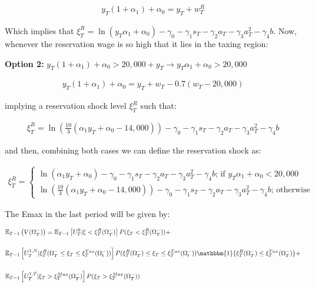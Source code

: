 \documentclass[11pt]{article}
\begin{document}
\begin{align}
	y_T(1+\alpha_1)+\alpha_0=y_T+w_T^R
\end{align}

Which implies that $\xi_T^R=\ln(y_T\alpha_1+\alpha_0)-\gamma_0-\gamma_1s_T-\gamma_2a_T-\gamma_3a_T^2-\gamma_4b$. Now, whenever the reservation wage is so high that it lies in the taxing region:

\textbf{Option 2:} $y_T(1+\alpha_1)+\alpha_0>20,000+y_T\rightarrow y_T\alpha_1+\alpha_0>20,000$


\begin{align}
	y_T(1+\alpha_1)+\alpha_0=y_T+w_T-0.7(w_T-20,000)
\end{align}

implying a reservation shock level $\xi_T^R$ such that:

\begin{align}
	\xi_T^R=\ln\left( \frac{10}{3}(\alpha_1y_T+\alpha_0-14,000)\right)-\gamma_0-\gamma_1s_T-\gamma_2a_T-\gamma_3a_T^2-\gamma_4b
\end{align}

and then, combining both cases we can define the reservation shock as:


\begin{align}
	\xi_T^R=\begin{cases}
		\ln(\alpha_1y_T+\alpha_0)-\gamma_0-\gamma_1s_T-\gamma_2a_{T}-\gamma_3a_{T}^2-\gamma_4b  \text{;  if  } y_T\alpha_1+\alpha_0<20,000 \\
		\ln\left( \frac{10}{3}(\alpha_1y_T+\alpha_0-14,000)\right)-\gamma_0-\gamma_1s_T-\gamma_2a_{T}-\gamma_3a_{T}^2-\gamma_4b \text{;   otherwise}
	\end{cases}
\end{align}

The Emax in the last period will be given by:


\begin{align}
	& \mathbb{E}_{T-1}\left(V(\Omega_T^-) \right)=\mathbb{E}_{T-1}\left[U_T^{0}| \xi<\xi_T^R(\Omega_T^-) \right]P(\xi_T<\xi_T^R(\Omega_T^-) )+\nonumber \\[0.2in]
	& \mathbb{E}_{T-1}\left[U_T^{1,N}| \xi_T^R(\Omega_T^-\leq \xi_T\leq \xi_T^{Tax}(\Omega_t^-)) \right]P(\xi_T^R(\Omega_T^-)\leq \xi_T\leq \xi_T^{Tax}(\Omega_t^-)) \mathbbm{1}\{\xi_T^R(\Omega_T^-)\leq\xi_T^{Tax}(\Omega_T^-)\}+\nonumber \\[0.2in]
	& \mathbb{E}_{T-1}\left[U_T^{1,T}| \xi_T>\xi_T^{Max}(\Omega_T^-) \right]P(\xi_T>\xi_T^{Max}(\Omega_T^-))
\end{align}
\end{document}

